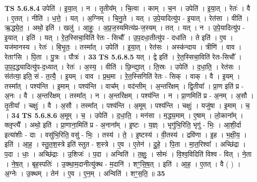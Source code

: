 \documentclass[17pt]{extarticle}
\begin{document}
                  \newline
                                \textbf{ TS 5.6.8.4} \newline
                  उपेति॑ । इ॒या॒त् । न । तृ॒तीय᳚म् । चि॒त्वा । काम् । च॒न । उपेति॑ । इ॒या॒त् । रेतः॑ । वै । ए॒तत् । नीति॑ । ध॒त्ते॒ । यत् । अ॒ग्निम् । चि॒नु॒ते । यत् । उ॒पे॒यादित्यु॑प - इ॒यात् । रेत॑सा । वीति॑ । ऋ॒द्ध्ये॒त॒ । अथो॒ इति॑ । खलु॑ । आ॒हुः॒ । अ॒प्र॒ज॒स्यमित्य॑प्र-ज॒स्यम् । तत् । यत् । न । उ॒पे॒यादित्यु॑प - इ॒यात् । इति॑ । यत् । रे॒त॒स्सिचा॒विति॑ रेतः - सिचौ᳚ । उ॒प॒दधा॒तीत्यु॑प - दधा॑ति । ते इति॑ । ए॒व । यज॑मानस्य । रेतः॑ । बि॒भृ॒तः॒ । तस्मा᳚त् । उपेति॑ । इ॒या॒त् । रेत॑सः । अस्क॑न्दाय । त्रीणि॑ । वाव । रेताꣳ॑सि । पि॒ता । पु॒त्रः । पौत्रः॑ । \textbf{  33} \newline
                  \newline
                                \textbf{ TS 5.6.8.5} \newline
                  यत् । द्वे इति॑ । रे॒त॒स्सिचा॒विति॑ रेतः-सिचौ᳚ । उ॒प॒द॒द्ध्यादित्यु॑प-द॒ध्यात् । रेतः॑ । अ॒स्य॒ । वीति॑ । छि॒न्द्या॒त् । ति॒स्रः । उपेति॑ । द॒धा॒ति॒ । रेत॑सः । संत॑त्या॒ इति॒ सं - त॒त्यै॒ । इ॒यम् । वाव । प्र॒थ॒मा । रे॒त॒स्सिगिति॑ रेतः - सिक् । वाक् । वै । इ॒यम् । तस्मा᳚त् । पश्य॑न्ति । इ॒माम् । पश्य॑न्ति । वाच᳚म् । वद॑न्तीम् । अ॒न्तरि॑क्षम् । द्वि॒तीया᳚ । प्रा॒ण इति॑ प्र - अ॒नः । वै । अ॒न्तरि॑क्षम् । तस्मा᳚त् । न । अ॒न्तरि॑क्षम् । पश्य॑न्ति । न । प्रा॒णमिति॑ प्र - अ॒नम् । अ॒सौ । तृ॒तीया᳚ ।   चक्षुः॑ । वै । अ॒सौ । तस्मा᳚त् । पश्य॑न्ति । अ॒मूम् । पश्य॑न्ति । चक्षुः॑ । यजु॑षा । इ॒माम् । च॒ । \textbf{  34} \newline
                  \newline
                                \textbf{ TS 5.6.8.6} \newline
                  अ॒मूम् । च॒ । उपेति॑ । द॒धा॒ति॒ । मन॑सा । म॒द्ध्य॒माम् । ए॒षाम् । लो॒काना᳚म् । क्लृप्त्यै᳚ । अथो॒ इति॑ । प्रा॒णाना॒मिति॑ प्र - अ॒नाना᳚म् । इ॒ष्टः । य॒ज्ञ्ः । भृगु॑भि॒रिति॒ भृगु॑ - भिः॒ । आ॒शी॒र्दा इत्या॑शीः - दाः । वसु॑भि॒रिति॒ वसु॑ - भिः॒ । तस्य॑ । ते॒ । इ॒ष्टस्य॑ । वी॒तस्य॑ । द्रवि॑णा । इ॒ह । भ॒क्षी॒य॒ । इति॑ । आ॒ह॒ । स्तु॒त॒श॒स्त्रे इति॑ स्तुत - श॒स्त्रे । ए॒व । ए॒तेन॑ । दु॒हे॒ । पि॒ता । मा॒त॒रिश्वा᳚ । अच्छि॑द्रा । प॒दा । धाः॒ । अच्छि॑द्राः । उ॒शिजः॑ । प॒दा । अन्विति॑ । त॒क्षुः॒ । सोमः॑ । वि॒श्व॒विदिति॑ विश्व - वित् । ने॒ता । ने॒ष॒त् । बृह॒स्पतिः॑ । उ॒क्था॒म॒दानीत्यु॑क्थ - म॒दानि॑ । शꣳ॒॒सि॒ष॒त् । इति॑ । आ॒ह॒ । ए॒तत् । वै ( ) । अ॒ग्नेः । उ॒क्थम् । तेन॑ । ए॒व । ए॒न॒म् । अन्विति॑ । शꣳ॒॒स॒ति॒ ॥ \textbf{  35 } \newline
                  \newline
\end{document}
